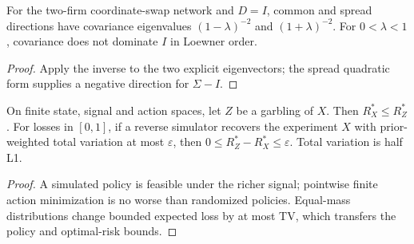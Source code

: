 \begin{lemma}\label{thm:persistence-counterexample}
  \leanok
  For the two-firm coordinate-swap network and $D=I$, common and spread
  directions have covariance eigenvalues $(1-\lambda)^{-2}$ and
  $(1+\lambda)^{-2}$. For $0<\lambda<1$, covariance does not dominate $I$
  in Loewner order.
\end{lemma}
\begin{proof}\leanok
  Apply the inverse to the two explicit eigenvectors; the spread quadratic
  form supplies a negative direction for $\Sigma-I$.
\end{proof}

\begin{theorem}\label{thm:decision-sufficiency}
  \leanok
  On finite state, signal and action spaces, let $Z$ be a garbling of $X$.
  Then $R_X^*\le R_Z^*$. For losses in $[0,1]$, if a reverse simulator
  recovers the experiment $X$ with prior-weighted total variation at most
  $\varepsilon$, then $0\le R_Z^*-R_X^*\le\varepsilon$.
  Total variation is half L1.
\end{theorem}
\begin{proof}\leanok
  A simulated policy is feasible under the richer signal; pointwise finite
  action minimization is no worse than randomized policies. Equal-mass
  distributions change bounded expected loss by at most TV, which transfers
  the policy and optimal-risk bounds.
\end{proof}

